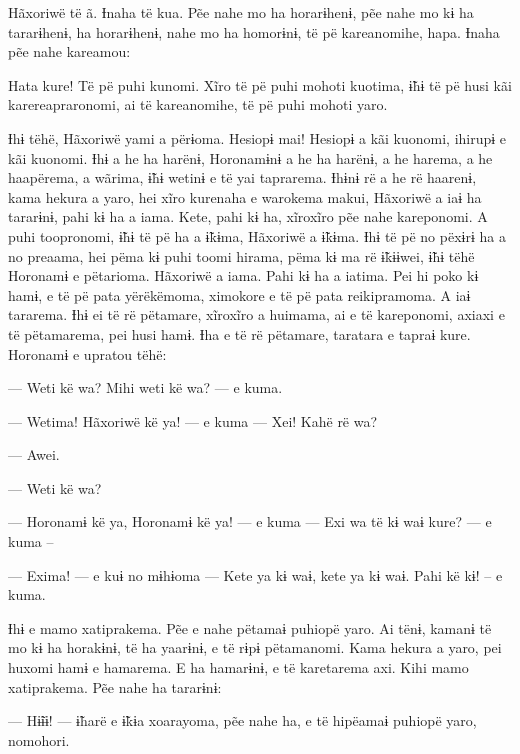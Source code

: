  

 

Hãxoriwë të ã. Ɨnaha të kua. Pẽe nahe mo ha horarɨhenɨ, pẽe nahe mo kɨ
ha tararɨhenɨ, ha horarɨhenɨ, nahe mo ha homorɨnɨ, të pë kareanomihe,
hapa. Ɨnaha pẽe nahe kareamou: 

Hata kure! Të pë puhi kunomi. Xĩro të pë puhi mohoti kuotima, ɨ̃hɨ të pë
husi kãi karereapraronomi, ai të kareanomihe, të pë puhi mohoti yaro. 

Ɨhɨ tëhë, Hãxoriwë yami a përɨoma. Hesiopɨ mai! Hesiopɨ a kãi kuonomi,
ihirupɨ e kãi kuonomi. Ɨhɨ a he ha harënɨ, Horonamɨnɨ a he ha harënɨ, a
he harema, a he haapërema, a wãrima, ɨ̃hɨ wetinɨ e të yai taprarema.
Ɨhɨnɨ rë a he rë haarenɨ, kama hekura a yaro, hei xĩro kurenaha e
warokema makui, Hãxoriwë a iaɨ ha tararɨnɨ, pahi kɨ ha a iama. Kete,
pahi kɨ ha, xĩroxĩro pẽe nahe kareponomi. A puhi toopronomi, ɨ̃hɨ të pë
ha a ɨ̃kɨma, Hãxoriwë a ɨ̃kɨma. Ɨhɨ të pë no pëxɨrɨ ha a no preaama, hei
pëma kɨ puhi toomi hirama, pëma kɨ ma rë ɨ̃kɨɨwei, ɨ̃hɨ tëhë Horonamɨ e
pëtarioma. Hãxoriwë a iama. Pahi kɨ ha a iatima. Pei hi poko kɨ hamɨ, e
të pë pata yërëkëmoma, ximokore e të pë pata reikipramoma. A iaɨ
tararema. Ɨhɨ ei të rë pëtamare, xĩroxĩro a huimama, ai e të kareponomi,
axiaxi e të pëtamarema, pei husi hamɨ. Ɨha e të rë pëtamare, taratara e
tapraɨ kure. Horonamɨ e upratou tëhë: 

 

\begin{center} \end{center}


 

 

— Weti kë wa? Mihi weti kë wa? --- e kuma. 

— Wetima! Hãxoriwë kë ya! --- e kuma --- Xei! Kahë rë wa? 

— Awei. 

— Weti kë wa?

— Horonamɨ kë ya, Horonamɨ kë ya! --- e kuma --- Exi wa të kɨ waɨ kure?
--- e kuma -- 

— Exima! --- e kuɨ no mɨhɨoma --- Kete ya kɨ waɨ, kete ya kɨ waɨ. Pahi kë
kɨ! -- e kuma. 

Ɨhɨ e mamo xatiprakema. Pẽe e nahe pëtamaɨ puhiopë yaro. Ai tënɨ, kamanɨ
të mo kɨ ha horakɨnɨ, të ha yaarɨnɨ, e të rɨpɨ pëtamanomi. Kama hekura a
yaro, pei huxomi hamɨ e hamarema. E ha hamarɨnɨ, e të karetarema axi.
Kihi mamo xatiprakema. Pẽe nahe ha tararɨnɨ: 

— Hɨ̃ɨɨ! --- ɨ̃harë e ɨ̃kɨa xoarayoma, pẽe nahe ha, e të hipëamaɨ puhiopë
yaro, nomohori. 

